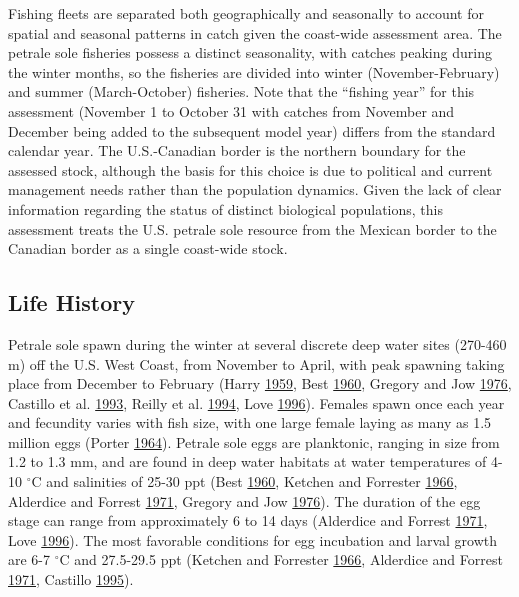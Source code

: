 \documentclass[12pt,]{article}
\begin{document}
Fishing fleets are separated both geographically and seasonally to
account for spatial and seasonal patterns in catch given the coast-wide
assessment area. The petrale sole fisheries possess a distinct
seasonality, with catches peaking during the winter months, so the
fisheries are divided into winter (November-February) and summer
(March-October) fisheries. Note that the ``fishing year'' for this
assessment (November 1 to October 31 with catches from November and
December being added to the subsequent model year) differs from the
standard calendar year. The U.S.-Canadian border is the northern
boundary for the assessed stock, although the basis for this choice is
due to political and current management needs rather than the population
dynamics. Given the lack of clear information regarding the status of
distinct biological populations, this assessment treats the U.S. petrale
sole resource from the Mexican border to the Canadian border as a single
coast-wide stock.

\subsection{Life History}\label{life-history}

Petrale sole spawn during the winter at several discrete deep water
sites (270-460 m) off the U.S. West Coast, from November to April, with
peak spawning taking place from December to February (Harry
\protect\hyperlink{ref-harry_time_1959}{1959}, Best
\protect\hyperlink{ref-best_petrale_1960}{1960}, Gregory and Jow
\protect\hyperlink{ref-gregory_validity_1976}{1976}, Castillo et al.
\protect\hyperlink{ref-castillo_g.c._environmental_1993}{1993}, Reilly
et al. \protect\hyperlink{ref-reilly_recreational_1994}{1994}, Love
\protect\hyperlink{ref-love_milton_probably_1996}{1996}). Females spawn
once each year and fecundity varies with fish size, with one large
female laying as many as 1.5 million eggs (Porter
\protect\hyperlink{ref-porter_notes_1964}{1964}). Petrale sole eggs are
planktonic, ranging in size from 1.2 to 1.3 mm, and are found in deep
water habitats at water temperatures of 4-10 \(^\circ\)C and salinities
of 25-30 ppt (Best \protect\hyperlink{ref-best_petrale_1960}{1960},
Ketchen and Forrester
\protect\hyperlink{ref-ketchen_population_1966}{1966}, Alderdice and
Forrest \protect\hyperlink{ref-alderdice_effects_1971}{1971}, Gregory
and Jow \protect\hyperlink{ref-gregory_validity_1976}{1976}). The
duration of the egg stage can range from approximately 6 to 14 days
(Alderdice and Forrest
\protect\hyperlink{ref-alderdice_effects_1971}{1971}, Love
\protect\hyperlink{ref-love_milton_probably_1996}{1996}). The most
favorable conditions for egg incubation and larval growth are 6-7
\(^\circ\)C and 27.5-29.5 ppt (Ketchen and Forrester
\protect\hyperlink{ref-ketchen_population_1966}{1966}, Alderdice and
Forrest \protect\hyperlink{ref-alderdice_effects_1971}{1971}, Castillo
\protect\hyperlink{ref-castillo_latitudinal_1995}{1995}).
\end{document}
